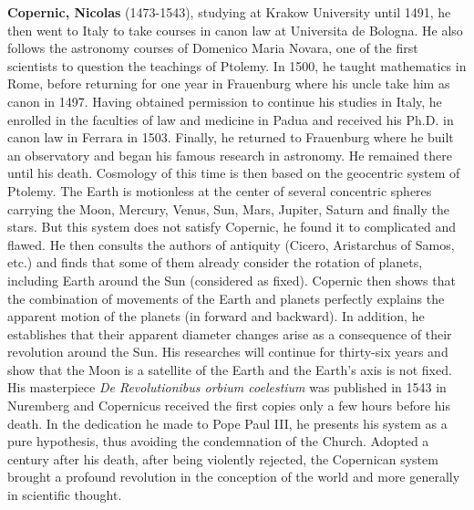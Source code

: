 \textbf{Copernic, Nicolas} (1473-1543), studying at Krakow University until 1491, he then went to Italy to take courses in canon law at Universita de Bologna. He also follows the astronomy courses of Domenico Maria Novara, one of the first scientists to question the teachings of Ptolemy. In 1500, he taught mathematics in Rome, before returning for one year in Frauenburg where his uncle take him as canon in 1497. Having obtained permission to continue his studies in Italy, he enrolled in the faculties of law and medicine in Padua and received his Ph.D. in canon law in Ferrara in 1503. Finally, he returned to Frauenburg where he built an observatory and began his famous research in astronomy. He remained there until his death. Cosmology of this time is then based on the geocentric system of Ptolemy. The Earth is motionless at the center of several concentric spheres carrying the Moon, Mercury, Venus, Sun, Mars, Jupiter, Saturn and finally the stars. But this system does not satisfy Copernic, he found it to complicated and flawed. He then consults the authors of antiquity (Cicero, Aristarchus of Samos, etc.) and finds that some of them already consider the rotation of planets, including Earth around the Sun (considered as fixed). Copernic then shows that the combination of movements of the Earth and planets perfectly explains the apparent motion of the planets (in forward and backward). In addition, he establishes that their apparent diameter changes arise as a consequence of their revolution around the Sun. His researches will continue for thirty-six years and show that the Moon is a satellite of the Earth and the Earth's axis is not fixed. His masterpiece \textit{De Revolutionibus orbium coelestium} was published in 1543 in Nuremberg and Copernicus received the first copies only a few hours before his death. In the dedication he made to Pope Paul III, he presents his system as a pure hypothesis, thus avoiding the condemnation of the Church. Adopted a century after his death, after being violently rejected, the Copernican system brought a profound revolution in the conception of the world and more generally in scientific thought.

